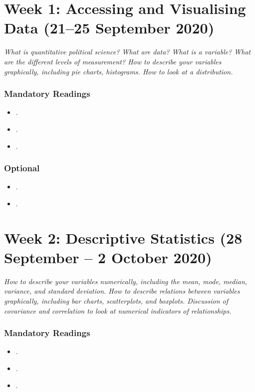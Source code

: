 \documentclass[abstract=on,parskip=full,headings=standardclasses,fontsize=11pt,paper=a4]{scrartcl}
\begin{document}
\tableofcontents

\section{Week 1: Accessing and Visualising Data (21--25 September 2020)}


\textit{What is quantitative political science? What are data? What is a variable? What are the different levels of measurement? How to describe your variables graphically, including pie charts, histograms. How to look at a distribution.}

\subsubsection*{Mandatory Readings}
\begin{itemize}
\item {}.
\item {}.
\item {}.
\end{itemize}

\subsubsection*{Optional}
\begin{itemize}
\item {}.
\item {}.
\end{itemize}

\section{Week 2: Descriptive Statistics (28 September -- 2 October 2020)}

\textit{How to describe your variables numerically, including the mean, mode, median, variance, and standard deviation. How to describe relations between variables graphically, including bar charts, scatterplots, and boxplots. Discussion of covariance and correlation to look at numerical indicators of relationships.}

\subsubsection*{Mandatory Readings}
\begin{itemize}
\item {}.
\item {}.
\item {}.
\end{itemize}
\end{document}
